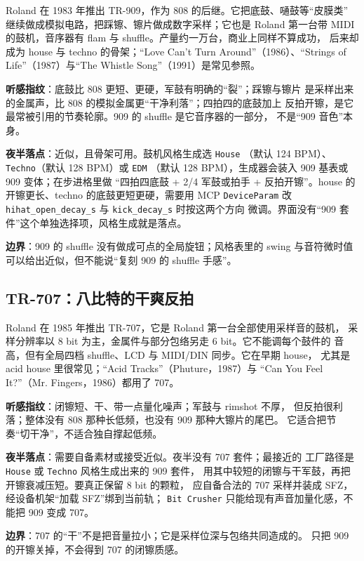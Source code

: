 Roland 在 1983 年推出 TR-909，作为 808 的后继。它把底鼓、嗵鼓等“皮膜类”
继续做成模拟电路，把踩镲、镲片做成数字采样；它也是 Roland 第一台带 MIDI
的鼓机，音序器有 flam 与 shuffle。产量约一万台，商业上同样不算成功，
后来却成为 house 与 techno 的骨架；“Love Can’t Turn Around”（1986）、“Strings of Life”（1987）与“The Whistle Song”（1991）是常见参照。

\textbf{听感指纹}：底鼓比 808 更短、更硬，军鼓有明确的“裂”；踩镲与镲片
是采样出来的金属声，比 808 的模拟金属更“干净利落”；四拍四的底鼓加上
反拍开镲，是它最常被引用的节奏轮廓。909 的 shuffle 是它音序器的一部分，
不是“909 音色”本身。

\textbf{夜半落点}：近似，且骨架可用。鼓机风格生成选 \texttt{House}
（默认 124 BPM）、\texttt{Techno}（默认 128 BPM）或 \texttt{EDM}
（默认 128 BPM），生成器会装入 909 基表或 909 变体；在步进格里做
“四拍四底鼓 + 2/4 军鼓或拍手 + 反拍开镲”。house 的开镲更长、techno
的底鼓更短更硬，需要用 MCP \texttt{DeviceParam} 改
\texttt{hihat\_open\_decay\_s} 与 \texttt{kick\_decay\_s} 时按这两个方向
微调。界面没有“909 套件”这个单独选择项，风格生成就是落点。

\textbf{边界}：909 的 shuffle 没有做成可点的全局旋钮；风格表里的 swing
与音符微时值可以给出近似，但不能说“复刻 909 的 shuffle 手感”。

\subsection{TR-707：八比特的干爽反拍}
\label{sec:iconic-707}

Roland 在 1985 年推出 TR-707，它是 Roland 第一台全部使用采样音的鼓机，
采样分辨率以 8 bit 为主，金属件与部分包络另走 6 bit。它不能调每个鼓件的
音高，但有全局四档 shuffle、LCD 与 MIDI/DIN 同步。它在早期 house，
尤其是 acid house 里很常见；“Acid Tracks”（Phuture，1987）与
“Can You Feel It?”（Mr. Fingers，1986）都用了 707。

\textbf{听感指纹}：闭镲短、干、带一点量化噪声；军鼓与 rimshot 不厚，
但反拍很利落；整体没有 808 那种长低频，也没有 909 那种大镲片的尾巴。
它适合把节奏“切干净”，不适合独自撑起低频。

\textbf{夜半落点}：需要自备素材或接受近似。夜半没有 707 套件；最接近的
工厂路径是 \texttt{House} 或 \texttt{Techno} 风格生成出来的 909 套件，
用其中较短的闭镲与干军鼓，再把开镲衰减压短。要真正保留 8 bit 的颗粒，
应自备合法的 707 采样并装成 SFZ，经设备机架“加载 SFZ”绑到当前轨；
\texttt{Bit Crusher} 只能给现有声音加量化感，不能把 909 变成 707。

\textbf{边界}：707 的“干”不是把音量拉小；它是采样位深与包络共同造成的。
只把 909 的开镲关掉，不会得到 707 的闭镲质感。

